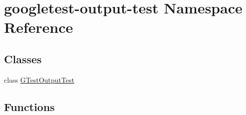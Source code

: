 \hypertarget{namespacegoogletest-output-test}{}\section{googletest-\/output-\/test Namespace Reference}
\label{namespacegoogletest-output-test}
\subsection*{Classes}
\begin{DoxyCompactItemize}
\item 
class \mbox{\hyperlink{classgoogletest-output-test_1_1_g_test_output_test}{G\+Test\+Output\+Test}}
\end{DoxyCompactItemize}
\subsection*{Functions}
